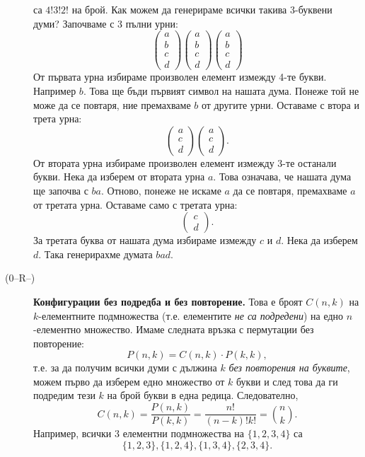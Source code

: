\begin{description}
  са $4!3!2!$ на брой.
  Как можем да генерираме всички такива 3-буквени думи?
  Започваме с 3 пълни урни:
  \[
  \left(\begin{array}{c}
      a\\
      b\\
      c\\
      d
      \end{array}
    \right)
  \left(\begin{array}{c}
      a\\
      b\\
      c\\
      d
      \end{array}
    \right)
  \left(\begin{array}{c}
      a\\
      b\\
      c\\
      d
      \end{array}
    \right)
  \]
  От първата урна избираме произволен елемент измежду 4-те букви. Например $b$.
  Това ще бъди първият символ на нашата дума. Понеже той не може да се повтаря,
  ние премахваме $b$ от другите урни. Оставаме с втора и трета урна:
  \[
  \left(\begin{array}{c}
      a\\
      c\\
      d
      \end{array}
    \right)
  \left(\begin{array}{c}
      a\\
      c\\
      d
      \end{array}
    \right).
    \]
    От втората урна избираме произволен елемент измежду 3-те останали букви.
    Нека да изберем от втората урна $a$.
    Това означава, че нашата дума ще започва с $ba$.
    Отново, понеже не искаме $a$ да се повтаря, премахваме $a$ от третата урна. Оставаме само с третата урна:
      \[
      \left(\begin{array}{c}
          c\\
          d
        \end{array}
      \right).
    \]
    За третата буква от нашата дума избираме измежду $c$ и $d$.
    Нека да изберем $d$.
    Така генерирахме думата $bad$.
  \item[(0--R--)]
  {\bf Конфигурации без подредба и без повторение.}
  Това е броят $C(n,k)$ на $k$-елементните подмножества (т.е. елементите {\em не са подредени}) на едно $n$-елементно множество.
  Имаме следната връзка с пермутации без повторение:
  \[P(n,k) = C(n,k)\cdot P(k,k),\] 
  т.е. за да получим всички думи с дължина $k$ {\em без повторения на буквите},
  можем първо да изберем едно множество от $k$ букви и след това да ги подредим тези $k$ на брой букви в една редица.
  Следователно,
  \[C(n,k) =  \frac{P(n,k)}{P(k,k)} = \frac{n!}{(n-k)!k!} = \binom{n}{k}.\]
  Например, всички $3$ елементни подмножества на $\{1,2,3,4\}$ са
  \[\{1,2,3\},\{1,2,4\},\{1,3,4\},\{2,3,4\}.\]


\end{description}
